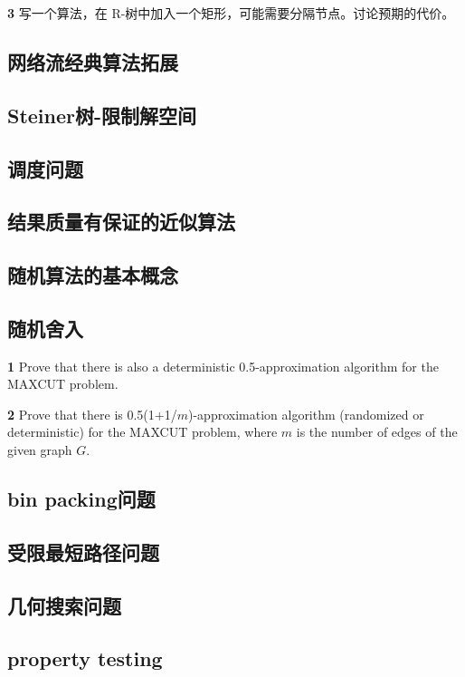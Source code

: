 \documentclass[a4paper,UTF8]{article}
\begin{document}
\vspace{6pt}
\textbf{3} 写一个算法，在 R-树中加入一个矩形，可能需要分隔节点。讨论预期的代价。

\subsection{网络流经典算法拓展}
\subsection{Steiner树-限制解空间}
\subsection{调度问题}
\subsection{结果质量有保证的近似算法}
\subsection{ }
\subsection{随机算法的基本概念}
\subsection{随机舍入}
\textbf{1} Prove that there is also a deterministic 0.5-approximation algorithm for
the MAXCUT problem.

\vspace{6pt}

\textbf{2} Prove that there is 0.5(1+1/$m$)-approximation algorithm (randomized or
deterministic) for the MAXCUT problem, where $m$ is the number of edges of the given
graph $G$.

\subsection{bin packing问题}
\subsection{受限最短路径问题}
\subsection{几何搜索问题}
\subsection{property testing}
\end{document}
